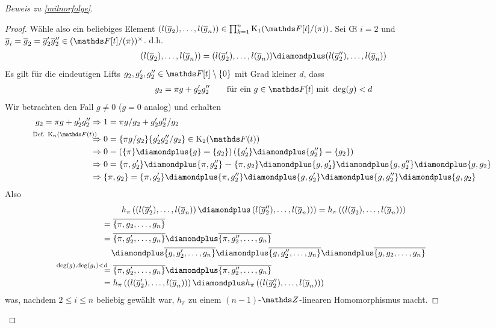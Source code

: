\documentclass[ngerman,fontsize=11pt, paper=a4, parskip=half, titlepage=true, toc=bib]{scrartcl}
\begin{document}
\begin{proof}[Beweis zu \ref{milnorfolge}]
\begin{proof}
    Wähle also ein beliebiges Element 
    $\left(l(\ov g_2),\dotsc,l(\ov g_n)\right)\in\prod_{k=1}^n\K_1(\Ftpi)$.
    Sei \OE{} $i=2$ und $\ov g_i=\ov g_2=\ov g_2'\ov g_2''\in(\Ftpi)^\times$.
    d.h. 
    \begin{gather*}
      (l(\ov g_2),\dotsc, l(\ov g_n))
      =(l(\ov g_2'),\dotsc, l(\ov g_n))\p(l(\ov g_2''),\dotsc,l(\ov g_n))
    \end{gather*}
    Es gilt für die eindeutigen Lifts
    $g_2,g_2',g_2''\in\F[t]\setminus\{0\}$ mit Grad kleiner $d$, dass 
    \begin{gather*}
      g_2=\pi g + g_2'g_2''
      \qquad\text{für ein }g\in\F[t]\text{ mit }\deg(g)<d
    \end{gather*}
    Wir betrachten den Fall $g\neq 0$ ($g=0$ analog)
    und erhalten
    \begin{align*}
      g_2=\pi g + g_2'g_2''
      &\Rightarrow
        1 = \pi g/g_2 + g_2'g_2''/g_2\\
      &\overset{\mathllap{\text{Def. $\KnFt$}}}{\Rightarrow}
        0 = \{\pi g/g_2\}\{g_2'g_2''/g_2\} \in\K_2(\Ft)\\
      &\Rightarrow 
        0= \left( \{\pi\}\p \{g\}\m \{g_2\} \right)
        \left( \{g_2'\}\p \{g_2''\}\m \{g_2\}\right)\\
      &\Rightarrow
      0=\{\pi,g_2'\}\p\{\pi,g_2''\}\m \{\pi,g_2\}
      \p\{g,g_2'\}\p\{g,g_2''\}\p\{g,g_2\}\\
      &\Rightarrow
        \{\pi,g_2\}=\{\pi,g_2'\}\p\{\pi,g_2''\}
        \p\{g,g_2'\}\p\{g,g_2''\}\p\{g,g_2\}    
    \end{align*}
    Also
    \begin{multline*}
      h_\pi\left(
        \left( l(\ov g_2'),\dotsc,l(\ov g_n)\right)
        \p \left( l(\ov g_2''),\dotsc,l(\ov g_n) \right)
      \right)
      =h_\pi\left( \left( l(\ov g_2),\dotsc,l(\ov g_n) \right)
      \right)\\
      \begin{aligned}
      &=\ov{\{\pi,g_2,\dotsc,g_n\}}\\
      &=\ov{\{\pi,g_2',\dotsc,g_n\}} \p \ov{\{\pi,g_2'',\dotsc,g_n\}}\\
      &\phantom{=~}\p \ov{\{g,g_2',\dotsc,g_n\}}
      \p \ov{\{g,g_2'',\dotsc,g_n\}} 
      \p \ov{\{g,g_2,\dotsc,g_n\}}\\
      &\overset{\mathllap{\deg(g),\deg(g_i)<d}}{=}
      \ov{\{\pi,g_2',\dotsc,g_n\}} \p \ov{\{\pi,g_2'',\dotsc,g_n\}}\\
      &=h_\pi\left(\left(l(\ov g_2'),\dotsc,l(\ov g_n)\right)\right)
      \p h_\pi\left(\left(l(\ov g_2''),\dotsc,l(\ov g_n)\right)\right)
      \end{aligned}
  \end{multline*}
  was, nachdem $2\leq i\leq n$ beliebig gewählt war, $h_\pi$ zu
    einem $(n-1)$-$\Z$-linearen Homomorphismus macht.


\end{proof}
\end{proof}
\end{document}
